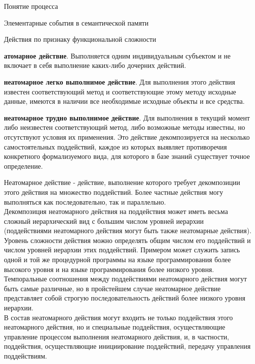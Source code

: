 \begin{frame}{\large Понятие процесса}
\begin{frame}{\large Элементарные события в семантической памяти}
\begin{frame}{\large Действия по признаку функциональной сложности}
\vspace{20}
    \begin{textitemize}
        \item \textbf{атомарное действие}. Выполняется одним индивидуальным субъектом и не включает в себя выполнение каких-либо дочерних действий.
        \item \textbf{неатомарное легко выполнимое действие}. Для выполнения этого действия известен соответствующий метод и соответствующие этому методу исходные данные, имеются в наличии все необходимые исходные объекты и все средства.
        \item \textbf{неатомарное трудно выполнимое действие}. Для выполнения в текущий момент либо неизвестен соответствующий метод, либо возможные методы известны, но отсутствуют условия их применения. Это действие декомпозируется на несколько самостоятельных поддействий, каждое из которых выявляет противоречия конкретного формализуемого вида, для которого в базе знаний существует точное определение. 
    \end{textitemize}
\end{frame}
\small{Неатомарное действие - действие, выполнение которого требует декомпозиции этого действия на множество поддействий. Более частные действия могу выполняться как последовательно, так и параллельно. \\
Декомпозиция неатомарного действия на поддействия может иметь весьма сложный иерархический вид с большим числом уровней иерархии (поддействиями неатомарного действия могут быть также неатомарные действия).\\
Уровень сложности действия можно определять общим числом его поддействий и числом уровней иерархии этих поддействий. Примером может служить запись одной и той же процедурной программы на языке программирования более высокого уровня и на языке программирования более низкого уровня.\\
Темпоральные соотношения между поддействиями неатомарного действия могут быть самые различные, но в пройстейшем случае неатомарное действие представляет собой строгую последовательность действий более низкого уровня иерархии.\\
В состав неатомарного действия могут входить не только поддействия этого неатомарного действия, но и специальные поддействия, осуществляющие управление процессом выполнения неатомарного действия, и, в частности, поддействия, осуществляющие инициирование поддействий, передачу управления поддействиям.}


\end{frame}
\end{frame}
